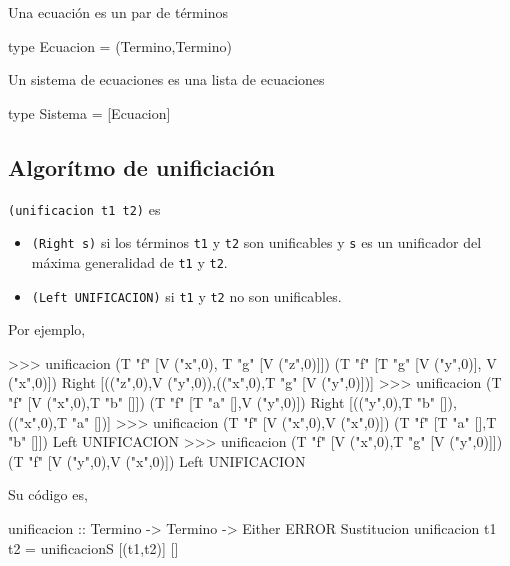 Una ecuación es un par de términos 
\begin{codigo}
type Ecuacion = (Termino,Termino)
\end{codigo}

Un sistema de ecuaciones es una lista de ecuaciones 
\begin{codigo}
type Sistema = [Ecuacion]
\end{codigo}

\subsection{Algorítmo de unificiación}

 \texttt{(unificacion t1 t2)} es
\begin{itemize}
\item \texttt{(Right s)} si los términos \texttt{t1} y \texttt{t2} son
  unificables y \texttt{s} es un unificador del máxima generalidad de
  \texttt{t1} y \texttt{t2}.
\item \texttt{(Left UNIFICACION)} si \texttt{t1} y \texttt{t2} no son
  unificables.
\end{itemize}
Por ejemplo,
\begin{sesion}
>>> unificacion (T "f" [V ("x",0), T "g" [V ("z",0)]])
                  (T "f" [T "g" [V ("y",0)], V ("x",0)])
Right [(("z",0),V ("y",0)),(("x",0),T "g" [V ("y",0)])]
>>> unificacion (T "f" [V ("x",0),T "b" []])
                  (T "f" [T "a" [],V ("y",0)])
Right [(("y",0),T "b" []),(("x",0),T "a" [])]
>>> unificacion (T "f" [V ("x",0),V ("x",0)])
                  (T "f" [T "a" [],T "b" []])
Left UNIFICACION
>>> unificacion (T "f" [V ("x",0),T "g" [V ("y",0)]])
                  (T "f" [V ("y",0),V ("x",0)])
Left UNIFICACION
\end{sesion}

Su código es,
\begin{codigo}
unificacion :: Termino -> Termino -> Either ERROR Sustitucion
unificacion t1 t2 = unificacionS [(t1,t2)] []
\end{codigo}
 


